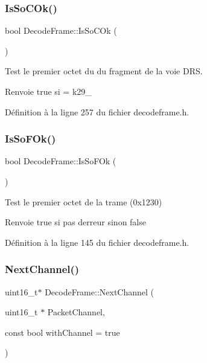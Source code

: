 \subsubsection{\texorpdfstring{Is\+So\+C\+Ok()}{IsSoCOk()}}
{\footnotesize\ttfamily bool Decode\+Frame\+::\+Is\+So\+C\+Ok (\begin{DoxyParamCaption}{ }\end{DoxyParamCaption})\hspace{0.3cm}{\ttfamily [inline]}}



Test le premier octet du du fragment de la voie D\+RS. 

\begin{DoxyReturn}{Renvoie}
true si = k29\+\_ 
\end{DoxyReturn}


Définition à la ligne 257 du fichier decodeframe.\+h.

\mbox{\label{class_decode_frame_af2b5f1f869480dd72404b2fc3f1bac80}} 
\subsubsection{\texorpdfstring{Is\+So\+F\+Ok()}{IsSoFOk()}}
{\footnotesize\ttfamily bool Decode\+Frame\+::\+Is\+So\+F\+Ok (\begin{DoxyParamCaption}{ }\end{DoxyParamCaption})\hspace{0.3cm}{\ttfamily [inline]}}



Test le premier octet de la trame (0x1230) 

\begin{DoxyReturn}{Renvoie}
true si pas d\textquotesingle{}erreur sinon false 
\end{DoxyReturn}


Définition à la ligne 145 du fichier decodeframe.\+h.

\mbox{\label{class_decode_frame_a067beb626d53137bfa6a331cfc963b5c}} 
\subsubsection{\texorpdfstring{Next\+Channel()}{NextChannel()}}
{\footnotesize\ttfamily uint16\+\_\+t$\ast$ Decode\+Frame\+::\+Next\+Channel (\begin{DoxyParamCaption}\item[{uint16\+\_\+t $\ast$}]{Packet\+Channel,  }\item[{const bool}]{with\+Channel = {\ttfamily true} }\end{DoxyParamCaption})}



